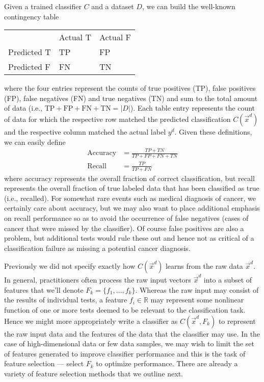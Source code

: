 Given a trained classifier $C$ and a dataset $D$, we can build the 
well-known contingency table
\begin{center}
\begin{tabular}{l|l|l|} 
\multicolumn{1}{l}{} &  \multicolumn{1}{l}{Actual T} & \multicolumn{1}{l}{Actual F} \\ \cline{2-3}
Predicted T & TP & FP \\ \cline{2-3}
Predicted F & FN & TN \\ \cline{2-3}
\end{tabular}
\end{center}
where the four entries represent the counts of true positives (TP), false positives (FP), false negatives (FN)
and true negatives (TN) and sum to the 
total amount of data (i.e., $\mathrm{TP} + \mathrm{FP} + \mathrm{FN} + \mathrm{TN} = |D|$).
Each table entry represents the count of data for which the respective row matched the 
predicted classification $C(\vec{x}^d)$ and the respective column matched the actual label $y^d$.
Given these definitions, we can easily define 
\begin{align*}
\textrm{Accuracy}  & = \frac{TP + TN}{TP + FP + FN + TN} \\
\textrm{Recall}    & = \frac{TP}{TP + FN}
\end{align*}
where accuracy represents the overall fraction of correct classification, but recall
represents the overall fraction of true labeled data that has been classified as
true (i.e., recalled).  For somewhat rare events such as medical diagnosis of cancer,
we certainly care about accuracy, but we may also want to place additional emphasis
on recall performance so as to avoid the occurrence of false negatives (cases of cancer
that were missed by the classifier).  Of course false positives are also a problem,
but additional tests would rule these out and hence not as critical of a classification
failure as missing a potential cancer diagnosis.

Previously we did not specify exactly how $C(\vec{x}^d)$ learns from the raw data
$\vec{x}^d$.  In general, practitioners often process the raw input vectors
$\vec{x}^d$ into a subset of features that we'll denote $F_k = \{ f_1,\ldots,f_k \}$.  Whereas
the raw input may consist of the results of individual tests, a feature $f_i \in \mathbb{R}$
may represent some nonlinear function of one or more tests deemed to be relevant to
the classification task.  Hence we might more appropriately write a classifier
as $C(\vec{x}^d,F_k)$ to represent the raw input data and the features
of the data that the classifier may use.
In the case of high-dimensional data or few data samples,
we may wish to limit the set of features generated to improve classifier performance
and this is the task of feature selection --- select $F_k$ to optimize
performance.  There are already a variety of feature selection methods that we outline
next.




